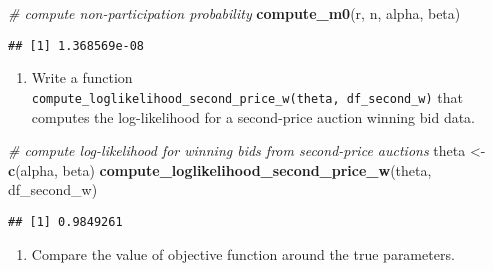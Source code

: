 \documentclass[
]{book}
\newenvironment{Shaded}{\begin{snugshade}}{\end{snugshade}}
\newcommand{\CommentTok}[1]{\textcolor[rgb]{0.56,0.35,0.01}{\textit{#1}}}
\newcommand{\KeywordTok}[1]{\textcolor[rgb]{0.13,0.29,0.53}{\textbf{#1}}}
\newcommand{\NormalTok}[1]{#1}
\newcommand{\StringTok}[1]{\textcolor[rgb]{0.31,0.60,0.02}{#1}}
\providecommand{\tightlist}{%
  \setlength{\itemsep}{0pt}\setlength{\parskip}{0pt}}
\begin{document}
\begin{Shaded}
\begin{Highlighting}[]
\CommentTok{# compute non-participation probability}
\KeywordTok{compute_m0}\NormalTok{(r, n, alpha, beta)}
\end{Highlighting}
\end{Shaded}

\begin{verbatim}
## [1] 1.368569e-08
\end{verbatim}

\begin{enumerate}
\def\labelenumi{\arabic{enumi}.}
\setcounter{enumi}{1}
\tightlist
\item
  Write a function \texttt{compute\_loglikelihood\_second\_price\_w(theta,\ df\_second\_w)} that computes the log-likelihood for a second-price auction winning bid data.
\end{enumerate}

\begin{Shaded}
\begin{Highlighting}[]
\CommentTok{# compute log-likelihood for winning bids from second-price auctions}
\NormalTok{theta <-}\StringTok{ }\KeywordTok{c}\NormalTok{(alpha, beta)}
\KeywordTok{compute_loglikelihood_second_price_w}\NormalTok{(theta, df_second_w)}
\end{Highlighting}
\end{Shaded}

\begin{verbatim}
## [1] 0.9849261
\end{verbatim}

\begin{enumerate}
\def\labelenumi{\arabic{enumi}.}
\setcounter{enumi}{2}
\tightlist
\item
  Compare the value of objective function around the true parameters.
\end{enumerate}
\end{document}
